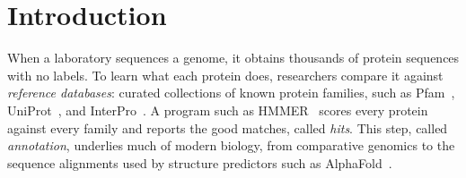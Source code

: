 \documentclass[letterpaper,twocolumn,10pt]{article}
\theoremstyle{definition}
\newcommand{\sys}{TARE\xspace}
\newcommand{\sys}{PARE\xspace}
\begin{document}
\begin{abstract}
On Pfam 38.1$\rightarrow$38.2, \sys is $\HeadlineMedian\times$ faster than a full rerun under that all\nobreakdash-record bounded audit
(median over \HeadlineN\ genomes after excluding \FlaggedCount\ wall\nobreakdash-quality flagged genome; 95\% CI
\HeadlineCIlow--\HeadlineCIhigh). Historical candidate\nobreakdash-population timings on the same nine genomes were $4.24\times$
(Bernoulli audit; 95\% CI 4.17--4.68) and $\HeadlineBoundedMedian\times$ (bounded $s{=}299$; 95\% CI
\HeadlineBoundedCIlow--\HeadlineBoundedCIhigh). Cost of checking versus unchecked replay is $\CostOfCheckingMedian\times$
(C/B over the same unflagged set).
Across 715{,}704 output lines from HMMER and Infernal, not one differed from a full run. \sys refused DIAMOND,
whose first filter reads bytes of the neighboring database entry, and BLAST+, whose unpinned probe rows fit none of
\sys's column rules.
\end{abstract}

\section{Introduction}
\label{sec:intro}

When a laboratory sequences a genome, it obtains thousands of protein sequences with no labels. To learn what
each protein does, researchers compare it against \textit{reference databases}: curated collections of known
protein families, such as Pfam~\cite{pfam2025}, UniProt~\cite{uniprot2025}, and InterPro~\cite{paysanlafosse2023interpro}.
A program such as HMMER~\cite{eddy2011hmmer} scores every protein against every family and reports the good
matches, called \textit{hits}. This step, called \textit{annotation}, underlies much of modern biology, from
comparative genomics to the sequence alignments used by structure predictors such as AlphaFold~\cite{jumper2021alphafold}.
\end{document}

